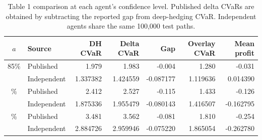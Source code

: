 \documentclass[11pt,a4paper]{article}
\theoremstyle{remark}
\begin{document}
\begin{table}[htbp]
\centering\footnotesize
\caption{Table 1 comparison at each agent's confidence level. Published delta CVaRs are obtained by subtracting the reported gap from deep-hedging CVaR. Independent agents share the same 100,000 test paths.}
\begin{tabular}{@{}clrrrrr@{}}
\toprule
$a$ & Source & DH CVaR & Delta CVaR & Gap & Overlay CVaR & Mean profit\\
\midrule
85\% & Published & 1.979 & 1.983 & -0.004 & 1.280 & -0.031 \\
 & Independent & 1.337382 & 1.424559 & -0.087177 & 1.119636 & 0.014390 \\
\addlinespace
90\% & Published & 2.412 & 2.527 & -0.115 & 1.433 & -0.126 \\
 & Independent & 1.875336 & 1.955479 & -0.080143 & 1.416507 & -0.162795 \\
\addlinespace
95\% & Published & 3.481 & 3.562 & -0.081 & 1.810 & -0.254 \\
 & Independent & 2.884726 & 2.959946 & -0.075220 & 1.865054 & -0.262780 \\
\bottomrule
\end{tabular}
\end{table}
\end{document}
